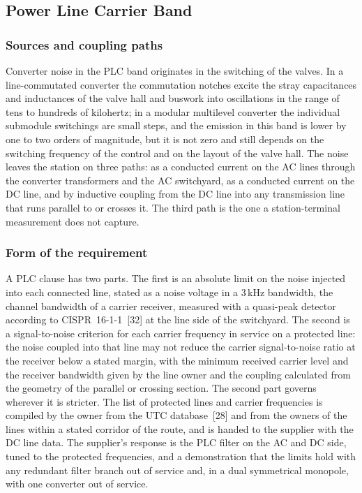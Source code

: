 \subsection{Power Line Carrier Band}
\label{sec:plc}

\subsubsection{Sources and coupling paths}
Converter noise in the PLC band originates in the switching of the valves. In
a line-commutated converter the commutation notches excite the stray
capacitances and inductances of the valve hall and buswork into oscillations
in the range of tens to hundreds of kilohertz; in a modular multilevel
converter the individual submodule switchings are small steps, and the
emission in this band is lower by one to two orders of magnitude, but it is
not zero and still depends on the switching frequency of the control and on
the layout of the valve hall. The noise leaves the station on three paths: as
a conducted current on the AC lines through the converter transformers and
the AC switchyard, as a conducted current on the DC line, and by inductive
coupling from the DC line into any transmission line that runs parallel to or
crosses it. The third path is the one a station-terminal measurement does not
capture.

\subsubsection{Form of the requirement}
A PLC clause has two parts. The first is an absolute limit on the noise
injected into each connected line, stated as a noise voltage in a 3\,kHz
bandwidth, the channel bandwidth of a carrier receiver, measured with a
quasi-peak detector according to CISPR~16-1-1~[32] at the line side of the
switchyard. The second is a signal-to-noise criterion for each carrier
frequency in service on a protected line: the noise coupled into that line
may not reduce the carrier signal-to-noise ratio at the receiver below a
stated margin, with the minimum received carrier level and the receiver
bandwidth given by the line owner and the coupling calculated from the
geometry of the parallel or crossing section. The second part governs
wherever it is stricter. The list of protected lines and carrier frequencies
is compiled by the owner from the UTC database~[28] and from the owners of the
lines within a stated corridor of the route, and is handed to the supplier
with the DC line data. The supplier's response is the PLC filter on the AC
and DC side, tuned to the protected frequencies, and a demonstration that the
limits hold with any redundant filter branch out of service and, in a dual
symmetrical monopole, with one converter out of service.

